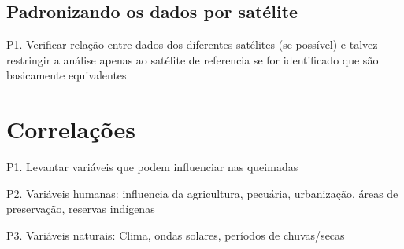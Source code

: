\documentclass[cic,tc]{iiufrgs}
\begin{document}
\section{Padronizando os dados por satélite}

P1. Verificar relação entre dados dos diferentes satélites (se possível) e talvez restringir a análise apenas ao satélite de referencia se for identificado que são basicamente equivalentes \par

\chapter{Correlações}

P1. Levantar variáveis que podem influenciar nas queimadas \par
P2. Variáveis humanas: influencia da agricultura, pecuária, 
urbanização, áreas de preservação, reservas indígenas \par
P3. Variáveis naturais: Clima, ondas solares, períodos de chuvas/secas \par





\end{document}
